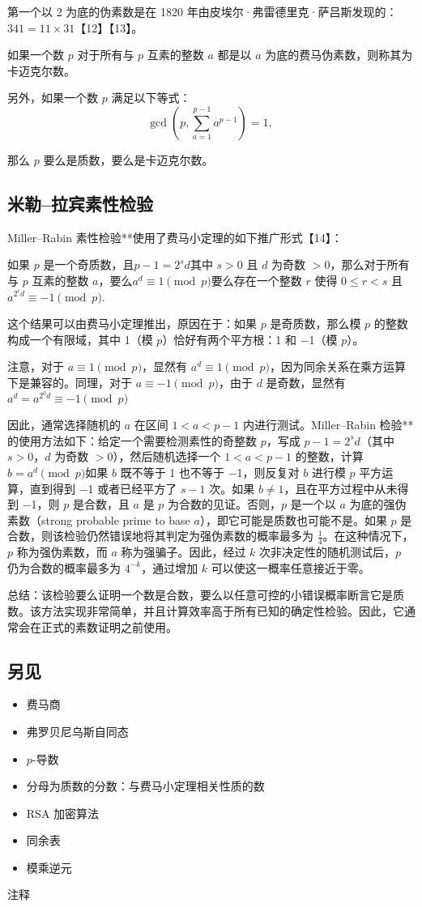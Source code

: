 第一个以 2 为底的伪素数是在 1820 年由皮埃尔·弗雷德里克·萨吕斯发现的：$341 = 11 \times 31$【12】【13】。  

如果一个数 \( p \) 对于所有与 \( p \) 互素的整数 \( a \) 都是以 \( a \) 为底的费马伪素数，则称其为卡迈克尔数。  

另外，如果一个数 \( p \) 满足以下等式：  
$$
\gcd\left(p, \sum_{a=1}^{p-1} a^{p-1}\right) = 1,~
$$

那么 $p$ 要么是质数，要么是卡迈克尔数。
\subsection{米勒–拉宾素性检验}

Miller–Rabin 素性检验**使用了费马小定理的如下推广形式【14】：

如果 $p$ 是一个奇质数，且$p - 1 = 2^s d$其中 $s > 0$ 且 $d$ 为奇数 $>0$，那么对于所有与 $p$ 互素的整数 $a$，要么$a^d \equiv 1 \pmod{p}$要么存在一个整数 $r$ 使得 $0 \le r < s$ 且$a^{2^r d} \equiv -1 \pmod{p}$.

这个结果可以由费马小定理推出，原因在于：如果 $p$ 是奇质数，那么模 $p$ 的整数构成一个有限域，其中 1（模 $p$）恰好有两个平方根：1 和 −1（模 $p$）。

注意，对于 $a \equiv 1 \pmod{p}$，显然有 $a^d \equiv 1 \pmod{p}$，因为同余关系在乘方运算下是兼容的。同理，对于 $a \equiv -1 \pmod{p}$，由于 $d$ 是奇数，显然有$a^d = a^{2^0 d} \equiv -1 \pmod{p}$

因此，通常选择随机的 $a$ 在区间 $1 < a < p - 1$ 内进行测试。Miller–Rabin 检验**的使用方法如下：给定一个需要检测素性的奇整数 $p$，写成 $p - 1 = 2^s d$（其中 $s > 0$，$d$ 为奇数 $> 0$），然后随机选择一个 $1 < a < p - 1$ 的整数，计算$b = a^d \pmod{p}$如果 $b$ 既不等于 1 也不等于 −1，则反复对 $b$ 进行模 $p$ 平方运算，直到得到 −1 或者已经平方了 $s - 1$ 次。如果 $b \neq 1$，且在平方过程中从未得到 −1，则 $p$ 是合数，且 $a$ 是 $p$ 为合数的见证。否则，$p$ 是一个以 $a$ 为底的强伪素数（strong probable prime to base $a$），即它可能是质数也可能不是。如果 $p$ 是合数，则该检验仍然错误地将其判定为强伪素数的概率最多为 $\frac14$。在这种情况下，$p$ 称为强伪素数，而 $a$ 称为强骗子。因此，经过 $k$ 次非决定性的随机测试后，$p$ 仍为合数的概率最多为 $4^{-k}$，通过增加 $k$ 可以使这一概率任意接近于零。

总结：该检验要么证明一个数是合数，要么以任意可控的小错误概率断言它是质数。该方法实现非常简单，并且计算效率高于所有已知的确定性检验。因此，它通常会在正式的素数证明之前使用。
\subsection{另见}
\begin{itemize}
\item 费马商
\item 弗罗贝尼乌斯自同态
\item $p$-导数
\item 分母为质数的分数：与费马小定理相关性质的数
\item RSA 加密算法
\item 同余表
\item 模乘逆元
\end{itemize}
注释

